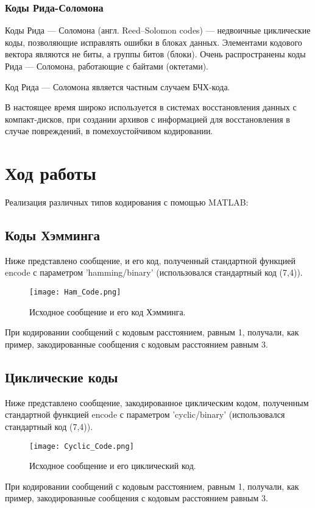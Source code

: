 \subsubsection{Коды Рида-Соломона}
Коды Рида — Соломона (англ. Reed–Solomon codes) — недвоичные циклические коды, позволяющие исправлять ошибки в блоках данных. Элементами кодового вектора являются не биты, а группы битов (блоки). Очень распространены коды Рида — Соломона, работающие с байтами (октетами).

Код Рида — Соломона является частным случаем БЧХ-кода.

В настоящее время широко используется в системах восстановления данных с компакт-дисков, при создании архивов с информацией для восстановления в случае повреждений, в помехоустойчивом кодировании.

\section{Ход работы}

Реализация различных типов кодирования с помощью MATLAB:


\subsection{Коды Хэмминга}
Ниже представлено сообщение, и его код, полученный стандартной функцией encode с параметром 'hamming/binary' (использовался стандартный код (7,4)).
\begin{figure}[H]
	\begin{center}
		\texttt{[image: Ham\_Code.png]}
		\caption{Исходное сообщение и его код Хэмминга.} %
		\label{Ham_Code} %
	\end{center}
\end{figure}
При кодировании сообщений с кодовым расстоянием, равным 1, получали, как пример, закодированные сообщения с кодовым расстоянием равным 3.

\subsection{Циклические коды}
Ниже представлено сообщение, закодированное циклическим кодом, полученным стандартной функцией encode с параметром 'cyclic/binary' (использовался стандартный код (7,4)).
\begin{figure}[H]
	\begin{center}
		\texttt{[image: Cyclic\_Code.png]}
		\caption{Исходное сообщение и его циклический код.} %
		\label{Cyclic_Code} %
	\end{center}
\end{figure}
При кодировании сообщений с кодовым расстоянием, равным 1, получали, как пример, закодированные сообщения с кодовым расстоянием равным 3.

